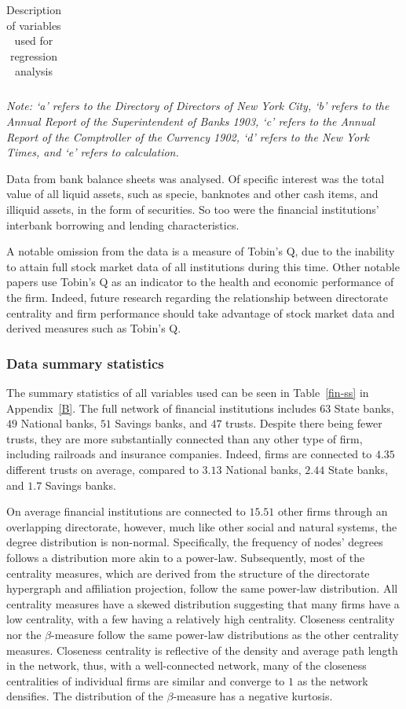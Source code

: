 \begin{table}[t!]
{\begin{tabular}{lll}
\end{tabular}
}
\begin{flushleft}
\emph{Note: `a' refers to the Directory of Directors of New York City, `b' refers to the Annual Report of the Superintendent of Banks 1903, `c' refers to the Annual Report of the Comptroller of the Currency 1902, `d' refers to the New York Times, and `e' refers to calculation.}
\end{flushleft}
\caption{Description of variables used for regression analysis}
\label{vardesc}
\end{table}

Data from bank balance sheets was analysed. Of specific interest was the total value of all liquid assets, such as specie, banknotes and other cash items, and illiquid assets, in the form of securities. So too were the financial institutions' interbank borrowing and lending characteristics.

A notable omission from the data is a measure of Tobin's Q, due to the inability to attain full stock market data of all institutions during this time. Other notable papers use Tobin's Q as an indicator to the health and economic performance of the firm. Indeed, future research regarding the relationship between directorate centrality and firm performance should take advantage of stock market data and derived measures such as Tobin's Q.

\subsubsection*{Data summary statistics}

The summary statistics of all variables used can be seen in Table~\ref{fin-ss} in Appendix~\ref{B}. The full network of financial institutions includes $63$ State banks, $49$ National banks, $51$ Savings banks, and $47$ trusts. Despite there being fewer trusts, they are more substantially connected than any other type of firm, including railroads and insurance companies. Indeed, firms are connected to $4.35$ different trusts on average, compared to $3.13$ National banks, $2.44$ State banks, and $1.7$ Savings banks.

On average financial institutions are connected to $15.51$ other firms through an overlapping directorate, however, much like other social and natural systems, the degree distribution is non-normal. Specifically, the frequency of nodes' degrees follows a distribution more akin to a power-law. Subsequently, most of the centrality measures, which are derived from the structure of the directorate hypergraph and affiliation projection, follow the same power-law distribution. All centrality measures have a skewed distribution suggesting that many firms have a low centrality, with a few having a relatively high centrality. Closeness centrality nor the $\beta$-measure follow the same power-law distributions as the other centrality measures. Closeness centrality is reflective of the density and average path length in the network, thus, with a well-connected network, many of the closeness centralities of individual firms are similar and converge to $1$ as the network densifies. The distribution of the $\beta$-measure has a negative kurtosis.

